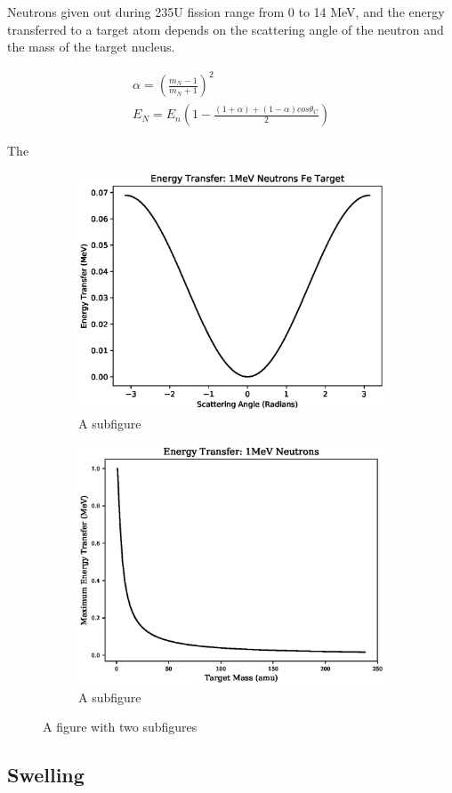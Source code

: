 Neutrons given out during 235U fission range from 0 to 14 MeV, and the energy transferred to a target atom depends on the scattering angle of the neutron and the mass of the target nucleus.  

\begin{equation}
\begin{split}
\alpha = (\frac{m_N-1}{m_N+1})^2 \\
E_N = E_n (1 - \frac{(1+\alpha) + (1 - \alpha) cos \theta_C}{2})
\end{split}
\label{eq:eqNeutronEnergyTransfer}
\end{equation}


The 

\begin{figure}
\centering
\begin{subfigure}{.5\textwidth}
  \centering
  \includegraphics[width=.4\linewidth]{chapters/background_austenitic_steels_in_nuclear/plots/scattering_angle.eps}
  \caption{A subfigure}
  \label{fig:sub1}
\end{subfigure}
\begin{subfigure}{.5\textwidth}
  \centering
  \includegraphics[width=.4\linewidth]{chapters/background_austenitic_steels_in_nuclear/plots/nuclei_mass.eps}
  \caption{A subfigure}
  \label{fig:sub2}
\end{subfigure}
\caption{A figure with two subfigures}
\label{fig:test}
\end{figure}









\subsection{Swelling}




